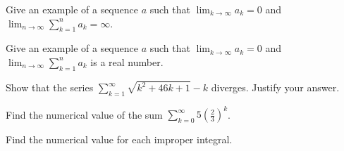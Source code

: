 \documentclass[12pt,fleqn,answers]{exam}
\begin{document}
\begin{questions}
    \question   Give an example of a sequence $a$ such that
    $\displaystyle \lim_{k \to \infty} a_k = 0$ and $\displaystyle \lim_{n \to \infty} \sum_{k=1}^n a_k  = \infty$.
    
    \begin{solution}[1.50in]
    \end{solution}
    \question   Give an example of a sequence $a$ such that
    $\displaystyle \lim_{k \to \infty} a_k = 0$ and $\displaystyle \lim_{n \to \infty} \sum_{k=1}^n a_k$ is a real 
    number.
    
    \begin{solution}%
    \end{solution}
    
    \newpage 
    \question   Show that the series $\displaystyle \sum_{k=1}^\infty \sqrt{k^2 + 46 k+ 1} - k$
    diverges. Justify your answer.
    \begin{solution}[2.50in]
    \end{solution}
    
    \question   Find the numerical value of the sum 
    $\sum_{k=0}^\infty 5 \left(\frac{2}{3} \right)^k$.
    
    \begin{solution}%
    \end{solution}
    
    \newpage 
    
    \question Find the numerical value for each improper integral.
    
\end{questions}
\end{document}
